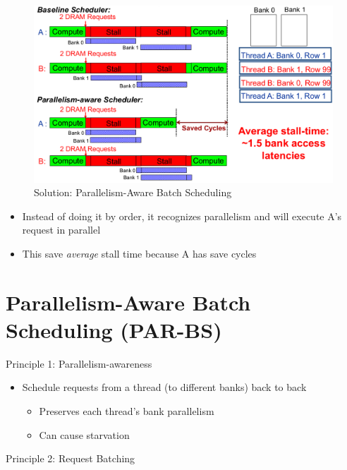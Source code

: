 \documentclass[]{article}
\providecommand{\tightlist}{%
  \setlength{\itemsep}{0pt}\setlength{\parskip}{0pt}}
\begin{document}
\begin{figure}
\centering
\includegraphics{./tex2pdf.-ee748c56ff17e1e1/a1d93c4ff3a8fa9c059a7a258f6fde35ebaef550.png}
\caption{Solution: Parallelism-Aware Batch Scheduling}
\end{figure}

\begin{itemize}
\tightlist
\item
  Instead of doing it by order, it recognizes parallelism and will
  execute A's request in parallel
\item
  This save \emph{average} stall time because A has save cycles
\end{itemize}

\hypertarget{parallelism-aware-batch-scheduling-par-bs}{%
\section{Parallelism-Aware Batch Scheduling
(PAR-BS)}\label{parallelism-aware-batch-scheduling-par-bs}}

Principle 1: Parallelism-awareness

\begin{itemize}
\tightlist
\item
  Schedule requests from a thread (to different banks) back to back

  \begin{itemize}
  \tightlist
  \item
    Preserves each thread's bank parallelism
  \item
    Can cause starvation
  \end{itemize}
\end{itemize}

Principle 2: Request Batching
\end{document}
